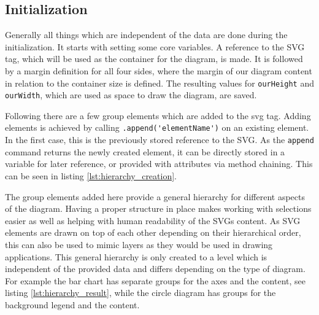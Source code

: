 \subsection{Initialization}
Generally all things which are independent of the data are done during the initialization. It starts with setting some core variables. A reference to the SVG tag, which will be used as the container for the diagram, is made. It is followed by a margin definition for all four sides, where the margin of our diagram content in relation to the container size is defined. The resulting values for \verb|ourHeight| and \verb|ourWidth|, which are used as space to draw the diagram, are saved. 

Following there are a few group elements which are added to the svg tag. Adding elements is achieved by calling \verb|.append('elementName')| on an existing element. In the first case, this is the previously stored reference to the SVG. As the \verb|append| command returns the newly created element, it can be directly stored in a variable for later reference, or provided with attributes via method chaining. This can be seen in listing \ref{lst:hierarchy_creation}.

The group elements added here provide a general hierarchy for different aspects of the diagram. Having a proper structure in place makes working with selections easier as well as helping with human readability of the SVGs content. As SVG elements are drawn on top of each other depending on their hierarchical order, this can also be used to mimic layers as they would be used in drawing applications. This general hierarchy is only created to a level which is independent of the provided data and differs depending on the type of diagram. For example the bar chart has separate groups for the axes and the content, see listing \ref{lst:hierarchy_result}, while the circle diagram has groups for the background legend and the content.

